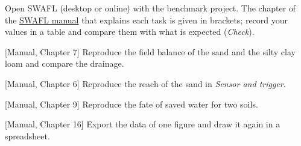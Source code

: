 {\small Open SWAFL (desktop or online) with the benchmark project. The chapter of the \href{https://github.com/halilunaziru73-creator/Coupled-Water-Fluxes-Pore-Scale-Dynamics-Precision-Irrigation-Mulching-Feedback-Loops/raw/main/Software/v1.1.0/SWAFL_Desktop/docs/manual_v1.1.0/SWAFL_Manual_v1.1.0.pdf}{SWAFL manual} that explains each task is given in brackets; record your values in a table and compare them with what is expected (\emph{Check}).}\par\vspace{3pt}
\begin{exlist}
\item {\color{khblue}[Manual, Chapter 7]} Reproduce the field balance of the sand and the silty clay loam and compare the drainage.\par{}
\item {\color{khblue}[Manual, Chapter 6]} Reproduce the reach of the sand in \emph{Sensor and trigger}.\par{}
\item {\color{khblue}[Manual, Chapter 9]} Reproduce the fate of saved water for two soils.\par{}
\item {\color{khblue}[Manual, Chapter 16]} Export the data of one figure and draw it again in a spreadsheet.\par{}
\end{exlist}
